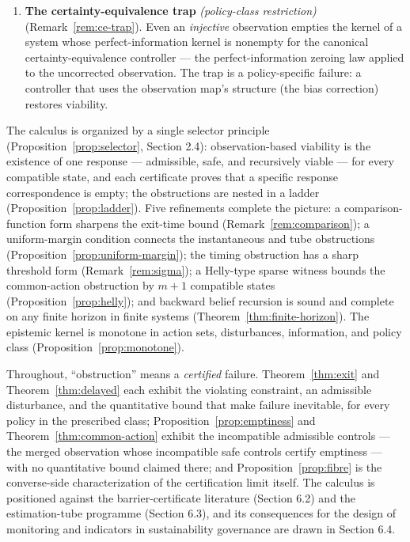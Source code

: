 \documentclass[10pt,twocolumn]{article}
\theoremstyle{definition}
\begin{document}
\begin{enumerate}
  \textbf{The fibre certification criterion} \emph{(finitely checkable)} (Proposition~\ref{prop:fibre}, Corollary~\ref{cor:certainly-safe}).
  An exact observation-only safety certifier --- a function of the
  observation that returns ``safe'' exactly on the safe set --- exists
  if and only if safe-set membership is constant on every observation
  fibre. The certainly-safe set is the sound relaxation: the largest set
  of observations that can be labeled safe without further information.
\item
  \textbf{The certainty-equivalence trap} \emph{(policy-class restriction)} (Remark~\ref{rem:ce-trap}). Even an
  \emph{injective} observation empties the kernel of a system whose
  perfect-information kernel is nonempty for the canonical
  certainty-equivalence controller --- the perfect-information zeroing
  law applied to the uncorrected observation. The trap is a
  policy-specific failure: a controller that uses the observation map's
  structure (the bias correction) restores viability.
\end{enumerate}

The calculus is organized by a single selector principle (Proposition~\ref{prop:selector}, Section 2.4):
observation-based viability is the existence of one response ---
admissible, safe, and recursively viable --- for every compatible state,
and each certificate proves that a specific response correspondence is
empty; the obstructions are nested in a ladder
(Proposition~\ref{prop:ladder}). Five refinements complete the picture:
a comparison-function form sharpens the exit-time bound
(Remark~\ref{rem:comparison}); a uniform-margin condition connects the
instantaneous and tube obstructions
(Proposition~\ref{prop:uniform-margin}); the timing obstruction has a
sharp threshold form (Remark~\ref{rem:sigma}); a Helly-type sparse
witness bounds the common-action obstruction by \(m+1\) compatible
states (Proposition~\ref{prop:helly}); and backward belief recursion is
sound and complete on any finite horizon in finite systems
(Theorem~\ref{thm:finite-horizon}). The epistemic kernel is monotone in
action sets, disturbances, information, and policy class
(Proposition~\ref{prop:monotone}).

Throughout, ``obstruction'' means a \emph{certified} failure. Theorem~\ref{thm:exit} and Theorem~\ref{thm:delayed} each exhibit the violating constraint, an admissible disturbance,
and the quantitative bound that make failure inevitable, for every policy in the prescribed class; Proposition~\ref{prop:emptiness} and Theorem~\ref{thm:common-action} exhibit the incompatible
admissible controls --- the merged observation whose incompatible safe
controls certify emptiness --- with no quantitative bound claimed there;
and Proposition~\ref{prop:fibre} is the converse-side characterization of the certification
limit itself. The calculus is positioned against
the barrier-certificate literature (Section 6.2) and the estimation-tube
programme (Section 6.3), and its consequences for the design of
monitoring and indicators in sustainability governance are drawn in
Section 6.4.
\end{document}

